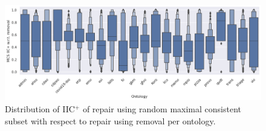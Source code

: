 \begin{figure}[ht]
    \centering
    \includegraphics[width=\textwidth]{resources/eiic-mcs-rem-ontology-violin.png}
    \caption{Distribution of IIC$^+$ of repair using random maximal consistent subset with respect to repair using removal per ontology.}
\end{figure}


